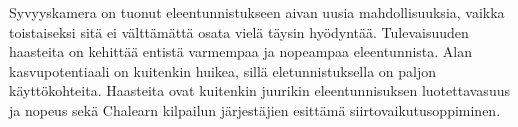 Syvyyskamera on tuonut eleentunnistukseen aivan uusia mahdollisuuksia, vaikka toistaiseksi sitä ei välttämättä osata vielä täysin hyödyntää.
Tulevaisuuden haasteita on kehittää entistä varmempaa ja nopeampaa eleentunnista. Alan kasvupotentiaali on kuitenkin huikea, sillä eletunnistuksella
on paljon käyttökohteita. Haasteita ovat kuitenkin juurikin eleentunnisuksen luotettavasuus ja nopeus sekä Chalearn kilpailun järjestäjien
esittämä siirtovaikutusoppiminen. \\








